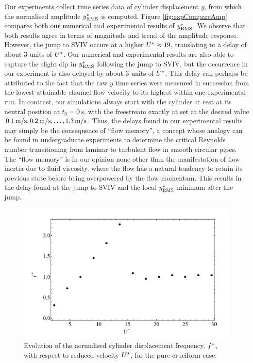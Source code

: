 \documentclass[oneside]{utmthesis}
\begin{document}
Our experiments collect time series data of cylinder displacement $y$, from which the normalised \rms{} amplitude $y^{*}_{\text{RMS}}$ is computed. Figure \ref{fig:expCompareAmp} compares both our numerical and experimental results of $y^{*}_{\text{RMS}}$. We observe that both results agree in terms of magnitude and trend of the amplitude response. However, the jump to SVIV occurs at a higher $U^{*} \approx 19$, translating to a delay of about 3 units of $U^{*}$. Our numerical and experimental results are also able to capture the slight dip in $y^{*}_{\text{RMS}}$ following the jump to SVIV, but the occurrence in our experiment is also delayed by about 3 units of $U^{*}$. This delay can perhaps be attributed to the fact that the raw $y$ time series were measured in succession from the lowest attainable channel flow velocity \uth{} to its highest \uel{} within one experimental run. In contrast, our simulations always start with the cylinder at rest at its neutral position at $t_{0} = \SI{0}{\second}$, with the freestream exactly at set at the desired value $\uon, \utw, \dots, \utt$. Thus, the delays found in our experimental results may simply be the consequence of ``flow memory'', a concept whose analogy can be found in undergraduate experiments to determine the critical Reynolds number transitioning from laminar to turbulent flow in smooth circular pipes. The ``flow memory'' is in our opinion none other than the manifestation of flow inertia due to fluid viscosity, where the flow has a natural tendency to retain its previous state before being overpowered by the flow momentum. This results in the delay found at the jump to SVIV and the local $y^{*}_{\text{RMS}}$ minimum after the jump.

\begin{figure}
  \centering
  \includegraphics[width=1\textwidth]{figs/yStrFreq5}
  \caption{Evolution of the normalised cylinder displacement frequency, $f^{*}$, with respect to reduced velocity $U^{*}$, for the pure cruciform case.}
  \label{fig:yStrFreq5}
\end{figure}
\end{document}
